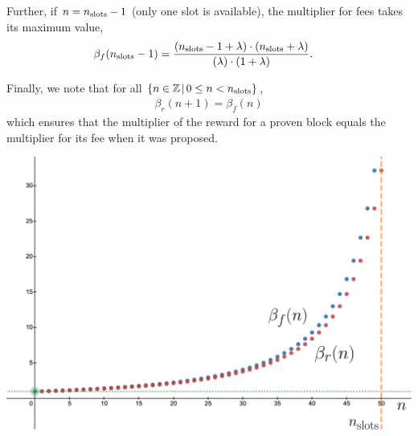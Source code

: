 \documentclass[9pt,oneside]{amsart}
\newenvironment{Figure}
  {\par\medskip\noindent\minipage{\linewidth}}
  {\endminipage\par\medskip}
\begin{document}
\begin{multicols}{2}
Further, if $n = n_\textnormal{slots}-1$ (only one slot is available),  the multiplier for fees takes its maximum value,
\begin{align}
\beta_f(n_\textnormal{slots}-1)
&= 
\frac{(n_\textnormal{slots}- 1 + \lambda ) \cdot (n_\textnormal{slots} + \lambda)}{(\lambda)\cdot (1 + \lambda)}.
\end{align}

Finally, we note that for all $\{n\in \mathbb{Z} \hspace{0.02in}|\hspace{0.02in}  0 \leq n < n_\textnormal{slots} \}$,
\begin{align}
    \beta_r(n+1) = \beta_f(n)
\end{align}
which ensures that the multiplier of the reward for a proven block equals the multiplier for its fee when it was proposed.



\begin{Figure}
 \centering
 \includegraphics[width=\linewidth]{fig/lambda10.png}
 \label{fig:f_slot_lambda1}
\end{Figure}


\end{multicols}
\end{document}
